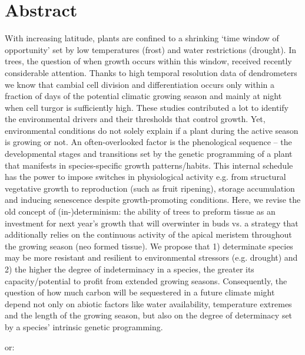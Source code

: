 \documentclass{article}
\begin{document}
	
	\newpage
	
	\section*{Abstract} %
	
	With increasing latitude, plants are confined to a shrinking ‘time window of opportunity’ set by low temperatures (frost) and water restrictions (drought). In trees, the question of when growth occurs within this window, received recently considerable attention. Thanks to high temporal resolution data of dendrometers we know that cambial cell division and differentiation occurs only within a fraction of days of the potential climatic growing season and mainly at night when cell turgor is sufficiently high. These studies contributed a lot to identify the environmental drivers and their thresholds that control growth. 
	Yet, environmental conditions do not solely explain if a plant during the active season is growing or not. An often-overlooked factor is the phenological sequence – the developmental stages and transitions set by the genetic programming of a plant that manifests in species-specific growth patterns/habits. This internal schedule has the power to impose switches in physiological activity e.g. from structural vegetative growth to reproduction (such as fruit ripening), storage accumulation and inducing senescence despite growth-promoting conditions.
	Here, we revise the old concept of (in-)determinism: the ability of trees to preform tissue as an investment for next year’s growth that will overwinter in buds vs. a strategy that additionally relies on the continuous activity of the apical meristem throughout the growing season (neo formed tissue). We propose that 1) determinate species may be more resistant and resilient to environmental stressors (e.g. drought) and 2) the higher the degree of indeterminacy in a species, the greater its capacity/potential to profit from extended growing seasons. Consequently, the question of how much carbon will be sequestered in a future climate might depend not only on abiotic factors like water availability, temperature extremes and the length of the growing season, but also on the degree of determinacy set by a species' intrinsic genetic programming.
	
	or:
	
\end{document}
